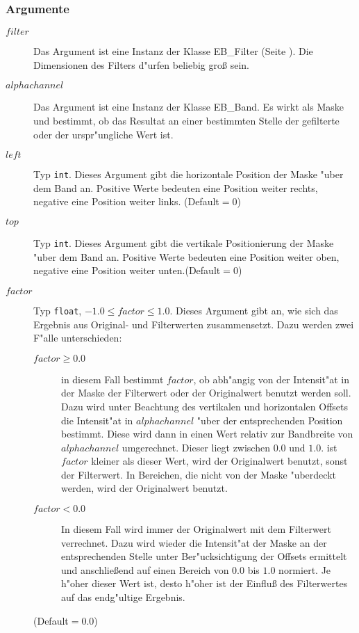 \documentclass[12pt,a4paper,draft,twoside,onecolumn,titlepage]{book}
\newcommand{\pref}[1]{(Seite \pageref{#1})}
\newcommand{\carg}[1]{$ #1 $}
\newcommand{\ctyp}[1]{{\tt #1}}
\newcommand{\class}[1]{{\sc #1}}
\begin{document}
\subsubsection{Argumente}
\begin{description}
\item[\carg{filter}]{Das Argument ist eine Instanz der Klasse \class{EB\_Filter} \pref{classebfilter}. Die Dimensionen des Filters d"urfen beliebig gro{\ss} sein.}
\item[\carg{alphachannel}]{Das Argument ist eine Instanz der Klasse \class{EB\_Band}. Es wirkt als Maske und bestimmt, ob das Resultat an einer bestimmten Stelle der gefilterte oder der urspr"ungliche Wert ist.}
\item[\carg{left}]{Typ \ctyp{int}. Dieses Argument gibt die horizontale Position der Maske "uber dem Band an. Positive Werte bedeuten eine Position weiter rechts, negative eine Position weiter links. (Default$=0$)}
\item[\carg{top}]{Typ \ctyp{int}. Dieses Argument gibt die vertikale Positionierung der Maske "uber dem Band an. Positive Werte bedeuten eine Position weiter oben, negative eine Position weiter unten.(Default$=0$)}
\item[\carg{factor}]{Typ \ctyp{float}, $-1.0\le factor\le 1.0$. Dieses Argument gibt an, wie sich das Ergebnis aus Original- und Filterwerten zusammensetzt. Dazu werden zwei F"alle unterschieden:
\begin{description}
\item[$factor\ge 0.0$]{in diesem Fall bestimmt \carg{factor}, ob abh"angig von der Intensit"at in der Maske der Filterwert oder der Originalwert benutzt werden soll. Dazu wird unter Beachtung des vertikalen und horizontalen Offsets die Intensit"at in \carg{alphachannel} "uber der entsprechenden Position bestimmt. Diese wird dann in einen Wert relativ zur Bandbreite von \carg{alphachannel} umgerechnet. Dieser liegt zwischen $0.0$ und $1.0$. ist \carg{factor} kleiner als dieser Wert, wird der Originalwert benutzt, sonst der Filterwert. In Bereichen, die nicht von der Maske "uberdeckt werden, wird der Originalwert benutzt.}
\item[$factor< 0.0$]{In diesem Fall wird immer der Originalwert mit dem Filterwert verrechnet. Dazu wird wieder die Intensit"at der Maske an der entsprechenden Stelle unter Ber"ucksichtigung der Offsets ermittelt und anschlie{\ss}end auf einen Bereich von $0.0$ bis $1.0$ normiert. Je h"oher dieser Wert ist, desto h"oher ist der Einflu{\ss} des Filterwertes auf das endg"ultige Ergebnis.}
\end{description}
(Default$=0.0$)}
\end{description}
\end{document}
